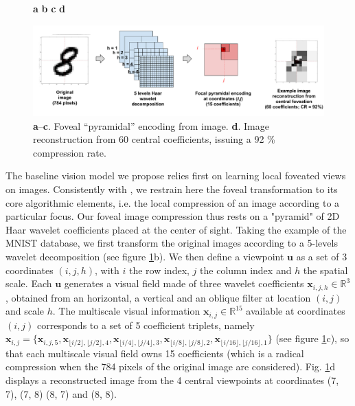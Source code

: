 \documentclass[12pt,twoside,openright]{article}
\begin{document}
\begin{figure}[b!]
	\centerline{
		\hspace{2cm}
		\textbf{a}
		\hspace{4cm}
		\textbf{b}	
		\hspace{3cm}
		\textbf{c}
		\hspace{3cm}
		\textbf{d}
		\hspace{2cm}			
	}
	\centerline{
		\includegraphics[width = \linewidth]{img/ICLR-foveated-model.pdf} 
	}
	
	\caption{\textbf{a}--\textbf{c}. Foveal ``pyramidal'' encoding from image.
		\textbf{d}. Image reconstruction from 60 central coefficients, issuing a 92 \% compression rate.  
		}\label{fig:foveated}
\end{figure}

The baseline vision model we propose relies first on learning local foveated views on images.
Consistently with \citep{kortum1996implementation,wang2003foveation}, we restrain here the foveal transformation to its core algorithmic elements, i.e. the local compression of an image according to a particular focus. Our foveal image compression thus rests on a "pyramid" of 2D Haar wavelet coefficients placed at the center of sight. Taking the example of the MNIST database, we first transform the original images according to a 5-levels wavelet decomposition (see figure \ref{fig:foveated}b). We then define a viewpoint $\boldsymbol{u}$ as a set of 3 coordinates $(i,j,h)$, with $i$ the row index, $j$ the column index and $h$ the spatial scale. Each $\boldsymbol{u}$ generates a visual field made of three wavelet coefficients $\boldsymbol{x}_{i,j,h} \in \mathbb{R}^3$, obtained from an horizontal, a vertical and an oblique filter at location $(i,j)$ and scale $h$.  The multiscale visual information $\boldsymbol{x}_{i,j} \in \mathbb{R}^{15}$ available at coordinates $(i,j)$ corresponds to a set of 5 coefficient triplets, namely $\boldsymbol{x}_{i,j}=\{\boldsymbol{x}_{i,j,5}, \boldsymbol{x}_{\lfloor i/2\rfloor,\lfloor j/2\rfloor,4}, \boldsymbol{x}_{\lfloor i/4\rfloor,\lfloor j/4\rfloor,3}, \boldsymbol{x}_{\lfloor i/8\rfloor,\lfloor j/8\rfloor, 2}, \boldsymbol{x}_{\lfloor i/16\rfloor,\lfloor j/16\rfloor, 1}\}$ (see figure \ref{fig:foveated}c), so that each multiscale visual field owns 15 coefficients (which is a radical compression when the 784 pixels of the original image are considered).
Fig. \ref{fig:foveated}d displays a reconstructed image from the 4 central viewpoints at coordinates (7, 7), (7, 8) (8, 7) and (8, 8).
\end{document}
